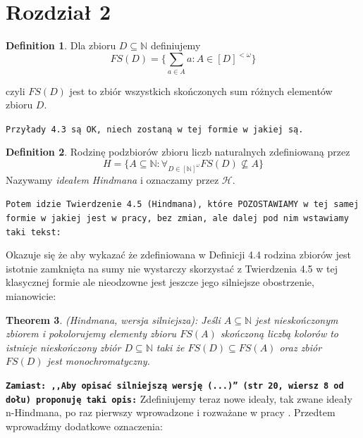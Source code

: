 \documentclass[12pt]{amsart}
\theoremstyle{plain}
\newtheorem{theorem}{Theorem}[section]
\theoremstyle{definition}
\newtheorem{definition}[theorem]{Definition}
\theoremstyle{remark}
\newcommand{\nnatural}{\mathbb{N}}
\newcommand{\idealHindmana}{\mathcal{H}}
\begin{document}
\section{Rozdział 2}

\begin{definition}
  Dla zbioru $D \subseteq \nnatural$
  definiujemy
  \[
FS(D) = \Big\lbrace \sum_{a\in A} a \colon A \in [D]^{<\omega} \Big\rbrace
\]
\end{definition}
czyli $FS(D)$ jest to zbiór wszystkich skończonych sum
różnych elementów zbioru $D$.

{\tt Przyłady 4.3 są OK, niech zostaną w tej formie w jakiej są.}

\begin{definition}
  Rodzinę podzbiorów zbioru liczb naturalnych
  zdefiniowaną przez
  \[
    H = \lbrace A \subseteq \nnatural \colon \forall_{D \in
[\nnatural]^{\omega}}
      FS(D) \not\subseteq A \rbrace
    \]
    Nazywamy {\it ideałem Hindmana} i oznaczamy przez $\idealHindmana$.
\end{definition}

{\tt Potem idzie Twierdzenie 4.5 (Hindmana), które POZOSTAWIAMY w tej samej
  formie w jakiej jest w pracy, bez zmian, ale dalej pod nim
wstawiamy taki tekst:}

Okazuje się że aby wykazać że zdefiniowana w Definicji 4.4 rodzina zbiorów
jest istotnie zamknięta na sumy nie wystarczy skorzystać z Twierdzenia 4.5 w tej
klasycznej formie ale nieodzowne jest jeszcze jego silniejsze obostrzenie, mianowicie:

\begin{theorem}(Hindmana, wersja silniejsza):
  Jeśli $A \subseteq \nnatural$ jest nieskończonym zbiorem i
  pokolorujemy elementy zbioru $FS(A)$ skończoną liczbą kolorów
  to istnieje nieskończony zbiór $D \subseteq \nnatural$
  taki że $FS(D) \subseteq FS(A)$ oraz zbiór $FS(D)$ jest monochromatyczny.
\end{theorem}

{\bf \tt Zamiast: ,,Aby opisać silniejszą wersję (...)'' (str 20, wiersz 8 od dołu)
  proponuję taki opis:}
Zdefiniujemy teraz nowe ideały, tak zwane ideały n-Hindmana,
po raz pierwszy wprowadzone i rozważane w pracy
\cite{MazurkiewiczZeberski2026}. Przedtem wprowadźmy dodatkowe oznaczenia:
\end{document}
